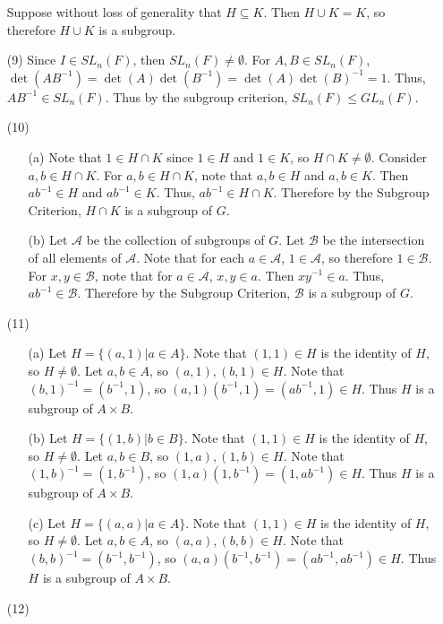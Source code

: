 \documentclass[12pt]{article}
\begin{document}
\begin{itemize}
Suppose without loss of generality that $H \subseteq K$. Then $H \cup K = K$, so therefore $H \cup K$ is a subgroup.
\item[(9)]
Since $I \in SL_n(F)$, then $SL_n(F) \neq \emptyset$. For $A, B \in SL_n(F)$, $\det(AB^{-1}) = \det(A)\det(B^{-1}) = \det(A)\det(B)^{-1} = 1$. Thus, $AB^{-1} \in SL_n(F)$. Thus by the subgroup criterion, $SL_n(F) \leq GL_n(F)$.
\item[(10)]
\begin{itemize}
\item[(a)]
Note that $1 \in H \cap K$ since $1 \in H$ and $1 \in K$, so $H \cap K \neq \emptyset$. Consider $a, b \in H \cap K$. For $a, b \in H \cap K$, note that $a, b \in H$ and $a, b \in K$. Then $ab^{-1} \in H$ and $ab^{-1} \in K$. Thus, $ab^{-1} \in H \cap K$. Therefore by the Subgroup Criterion, $H \cap K$ is a subgroup of $G$.
\item[(b)]
Let $\mathcal{A}$ be the collection of subgroups of $G$. Let $\mathcal{B}$ be the intersection of all elements of $\mathcal{A}$. Note that for each $a \in \mathcal{A}$, $1 \in \mathcal{A}$, so therefore $1 \in \mathcal{B}$. For $x, y \in \mathcal{B}$, note that for $a \in \mathcal{A}$, $x, y \in a$. Then $xy^{-1} \in a$. Thus, $ab^{-1} \in \mathcal{B}$. Therefore by the Subgroup Criterion, $\mathcal{B}$ is a subgroup of $G$.
\end{itemize}
\item[(11)]
\begin{itemize}
\item[(a)]
Let $H = \{ (a, 1) | a \in A \}$. Note that $(1, 1) \in H$ is the identity of $H$, so $H \neq \emptyset$. Let $a, b \in A$, so $(a, 1), (b, 1) \in H$. Note that $(b, 1)^{-1} = (b^{-1} , 1)$, so $(a, 1)(b^{-1}, 1) = (ab^{-1}, 1) \in H$. Thus $H$ is a subgroup of $A \times B$.
\item[(b)]
Let $H = \{ (1, b) | b \in B \}$. Note that $(1, 1) \in H$ is the identity of $H$, so $H \neq \emptyset$. Let $a, b \in B$, so $(1, a), (1, b) \in H$. Note that $(1, b)^{-1} = (1, b^{-1})$, so $(1, a)(1, b^{-1}) = (1, ab^{-1}) \in H$. Thus $H$ is a subgroup of $A \times B$.
\item[(c)]
Let $H = \{ (a, a) | a \in A \}$. Note that $(1, 1) \in H$ is the identity of $H$, so $H \neq \emptyset$. Let $a, b \in A$, so $(a, a), (b, b) \in H$. Note that $(b, b)^{-1} = (b^{-1} , b^{-1})$, so $(a, a)(b^{-1}, b^{-1}) = (ab^{-1}, ab^{-1}) \in H$. Thus $H$ is a subgroup of $A \times B$.
\end{itemize}
\item[(12)]

\end{itemize}
\end{document}
